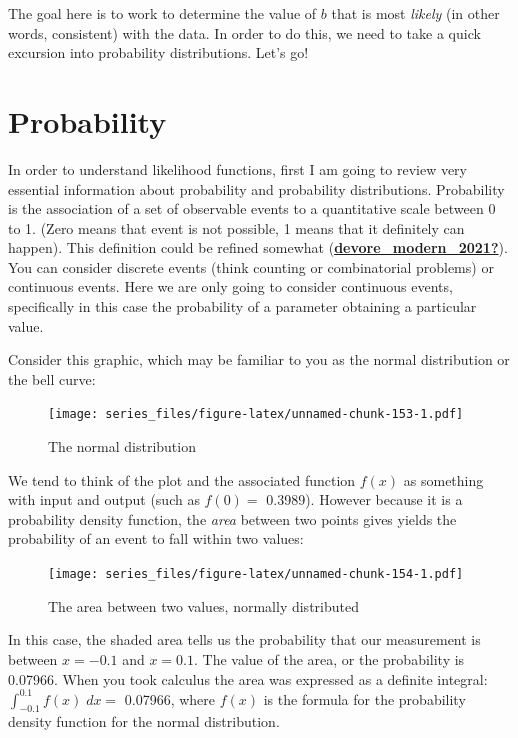 \documentclass[
]{book}
\theoremstyle{definition}
\theoremstyle{definition}
\theoremstyle{definition}
\theoremstyle{remark}
\begin{document}
The goal here is to work to determine the value of \(b\) that is most \emph{likely} (in other words, consistent) with the data. In order to do this, we need to take a quick excursion into probability distributions. Let's go!

\hypertarget{probability}{%
\section{Probability}\label{probability}}

In order to understand likelihood functions, first I am going to review very essential information about probability and probability distributions. Probability is the association of a set of observable events to a quantitative scale between 0 to 1. (Zero means that event is not possible, 1 means that it definitely can happen). This definition could be refined somewhat (\protect\hyperlink{ref-devore_modern_2021}{\textbf{devore\_modern\_2021?}}). You can consider discrete events (think counting or combinatorial problems) or continuous events. Here we are only going to consider continuous events, specifically in this case the probability of a parameter obtaining a particular value.

Consider this graphic, which may be familiar to you as the normal distribution or the bell curve:

\begin{figure}
\centering
\texttt{[image: series\_files/figure-latex/unnamed-chunk-153-1.pdf]}
\caption{\label{fig:unnamed-chunk-153}The normal distribution}
\end{figure}

We tend to think of the plot and the associated function \(f(x)\) as something with input and output (such as \(f(0)=\) 0.3989). However because it is a probability density function, the \emph{area} between two points gives yields the probability of an event to fall within two values:

\begin{figure}
\centering
\texttt{[image: series\_files/figure-latex/unnamed-chunk-154-1.pdf]}
\caption{\label{fig:unnamed-chunk-154}The area between two values, normally distributed}
\end{figure}

In this case, the shaded area tells us the probability that our measurement is between \(x=-0.1\) and \(x=0.1\). The value of the area, or the probability is 0.07966. When you took calculus the area was expressed as a definite integral: \(\displaystyle \int_{-0.1}^{0.1} f(x) \; dx=\) 0.07966, where \(f(x)\) is the formula for the probability density function for the normal distribution.
\end{document}
